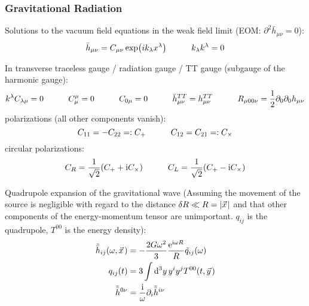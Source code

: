 		\subsubsection{Gravitational Radiation}
			Solutions to the vacuum field equations in the weak field limit (EOM: $\partial^2 \bar{h}_{\mu\nu} = 0$):
			\begin{equation}
				\bar{h}_{\mu\nu} = C_{\mu\nu} \exp(i k_\lambda x^\lambda) \hspace{30pt} k_\lambda k^\lambda = 0
			\end{equation}

			\noindent
			In transverse traceless gauge / radiation gauge / TT gauge (subgauge of the harmonic gauge):
			\begin{equation}
				\begin{aligned}
					k^\lambda C_{\lambda\mu} &= 0
					\hspace{30pt} C^\mu_\mu = 0
					\hspace{30pt} C_{0\mu} = 0
					\hspace{30pt} \bar{h}_{\mu\nu}^{TT} = {h}_{\mu\nu}^{TT}
					\hspace{30pt} R_{\mu 0 0 \nu} = \frac{1}{2} \partial_0 \partial_0 h_{\mu\nu} \\
				\end{aligned}
			\end{equation}
			polarizations (all other components vanish):
			\begin{equation}
				C_{11} = -C_{22} =: C_+
				\hspace{30pt} C_{12} = C_{21} =: C_\times
			\end{equation}
			circular polarizations:
			\begin{equation}
				C_R = \frac{1}{\sqrt{2}} (C_+ + \mathrm{i} C_\times)
				\hspace{30pt} C_L = \frac{1}{\sqrt{2}} (C_+ - \mathrm{i} C_\times)
			\end{equation}

			\noindent
			Quadrupole expansion of the gravitational wave (Assuming the movement of the source is negligible with regard to the distance $\delta R \ll R=\abs{\vec{x}}$ and that other components of the energy-momentum tensor are unimportant. $q_{ij}$ is the quadrupole, $T^{00}$ is the energy density):
			\begin{equation}
				\begin{aligned}
					\tilde{\bar{h}}_{ij}(\omega,\vec{x}) &= -\frac{2G\omega^2}{3}\frac{\ex^{\i\omega R}}{R} \tilde{q}_{ij}(\omega) \\
					q_{ij}(t) &= 3\int \dd^3 y\, y^i y^j T^{00}(t,\vec{y}) \\
					\tilde{\bar{h}}^{0\nu} &= \frac{\i}{\omega}\partial_i \tilde{\bar{h}}^{i\nu}
				\end{aligned}
			\end{equation}

